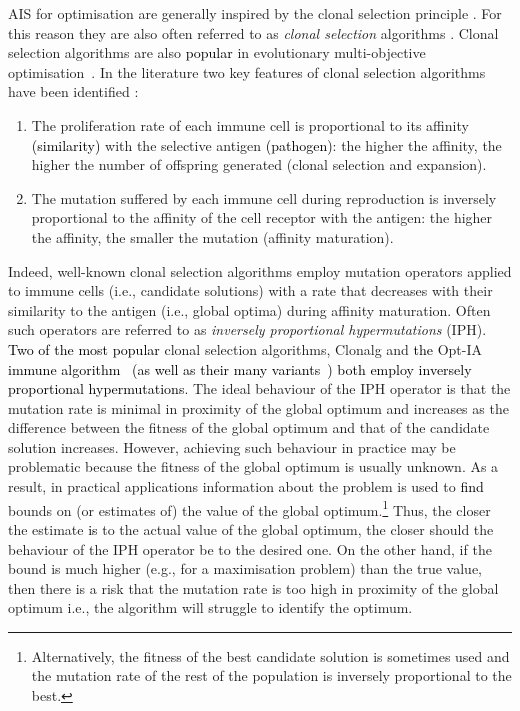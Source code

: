 \documentclass[lettersize,journal]{IEEEtran}
\newcommand{\new}[1]{\textcolor{black}{#1}}
\newcommand{\rerev}[1]{\textcolor{purple}{#1}}
\newcommand{\rev}[1]{\textcolor{black}{#1}}
\begin{document}
AIS for optimisation \cite{DeCastroTimmisBook,MO2020AAAI} are generally inspired by the clonal selection principle  \cite{Burnet1959}.
For this reason they are also often referred  to as {\it clonal selection} algorithms \cite{DeCastroTimmisBook}. 
Clonal selection algorithms are also \rev{popular} in evolutionary multi-objective optimisation~\cite{CoelloEMO2025,Coello2022,COY25,HuangZhou2020,EMOReview}. 
In the literature two key features of clonal selection algorithms have been identified \cite{Brownlee2007}: 
\begin{enumerate}
	\item  The proliferation rate of each immune cell is proportional to its affinity \new{(similarity)} with the selective antigen \new{(pathogen)}: the higher the affinity, 
	the higher the number of offspring generated (clonal selection and expansion). \item The mutation suffered by each immune cell during reproduction is inversely proportional to the affinity of the cell receptor with the antigen: the higher the affinity, 
	the smaller the mutation (affinity maturation).
\end{enumerate}
Indeed, well-known clonal selection algorithms employ mutation operators applied to immune cells (i.e., candidate solutions) with a rate that decreases with their similarity to the 
antigen (i.e., global optima) during affinity maturation. Often such operators are referred to as {\it inversely proportional hypermutations} (IPH). 
\new{Two of the most popular} clonal selection algorithms, Clonalg \cite{DecastroVonzuben2002}   and \new{the} Opt-IA \new{immune algorithm~\cite{CutelloNicosiaPavoneTimmis2007} (as well as their many variants~\cite{ClonalSelectionReview}) both employ inversely proportional hypermutations}.  
The ideal behaviour of the IPH operator is that the mutation rate is minimal in proximity of the global optimum and increases as the difference between the fitness of the global optimum
and that of the candidate solution increases. However, achieving such behaviour in practice may be problematic because the fitness of the global optimum is usually unknown.
As a result, in practical applications information about the problem is used to \new{find} bounds on (or estimates of)  the value of the global optimum\rerev{.}\footnote{Alternatively, the fitness of the best candidate solution is sometimes used and 
	the mutation rate of the rest of the population is inversely proportional to the best.}
Thus, the closer the estimate \rev{is} to the actual value of the global optimum, the closer should the behaviour of the IPH operator be to the desired one.
On the other hand,  if the bound is much higher (e.g., for a maximisation problem)  than the true value, then there is a risk that the mutation rate is too high in proximity of the global optimum 
i.e., the algorithm will struggle to identify the optimum. 
\end{document}
